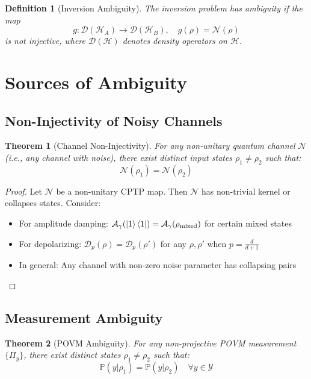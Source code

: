 \documentclass[12pt]{article}
\newtheorem{theorem}{Theorem}
\newtheorem{definition}{Definition}
\begin{document}
\begin{definition}[Inversion Ambiguity]
The inversion problem has ambiguity if the map
\[
g: \mathcal{D}(\mathcal{H}_A) \to \mathcal{D}(\mathcal{H}_B), \quad g(\rho) = \mathcal{N}(\rho)
\]
is not injective, where $\mathcal{D}(\mathcal{H})$ denotes density operators on $\mathcal{H}$.
\end{definition}

\section{Sources of Ambiguity}

\subsection{Non-Injectivity of Noisy Channels}
\begin{theorem}[Channel Non-Injectivity]
For any non-unitary quantum channel $\mathcal{N}$ (i.e., any channel with noise), there exist distinct input states $\rho_1 \neq \rho_2$ such that:
\[
\mathcal{N}(\rho_1) = \mathcal{N}(\rho_2)
\]
\end{theorem}

\begin{proof}
Let $\mathcal{N}$ be a non-unitary CPTP map. Then $\mathcal{N}$ has non-trivial kernel or collapses states. Consider:
\begin{itemize}
    \item For amplitude damping: $\mathcal{A}_\gamma(\ket{1}\bra{1}) = \mathcal{A}_\gamma(\rho_{\text{mixed}})$ for certain mixed states
    \item For depolarizing: $\mathcal{D}_p(\rho) = \mathcal{D}_p(\rho')$ for any $\rho, \rho'$ when $p = \frac{d}{d+1}$
    \item In general: Any channel with non-zero noise parameter has collapsing pairs
\end{itemize}
\end{proof}

\subsection{Measurement Ambiguity}
\begin{theorem}[POVM Ambiguity]
For any non-projective POVM measurement $\{\Pi_y\}$, there exist distinct states $\rho_1 \neq \rho_2$ such that:
\[
\mathbb{P}(y|\rho_1) = \mathbb{P}(y|\rho_2) \quad \forall y \in \mathcal{Y}
\]
\end{theorem}
\end{document}
